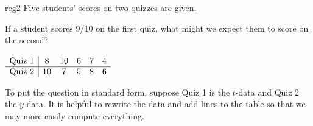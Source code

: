 \begin{example}{}{reg2}
	Five students' scores on two quizzes are given.\par
	\begin{minipage}[t]{0.69\linewidth}\vspace{-8pt}
		If a student scores 9/10 on the first quiz, what might we expect them to score on the second?
	\end{minipage}
	\hfill
	\begin{minipage}[t]{0.3\linewidth}\vspace{-20pt}
		\flushright
		$\begin{array}[t]{c|ccccc}
			\text{Quiz 1}&8&10&6&7&4\\\hline
			\text{Quiz 2}&10&7&5&8&6
		\end{array}$
	\end{minipage}\medbreak

	To put the question in standard form, suppose Quiz 1 is the $t$-data and Quiz 2 the $y$-data. It is helpful to rewrite the data and add lines to the table so that we may more easily compute everything.\par
	

\end{example}
